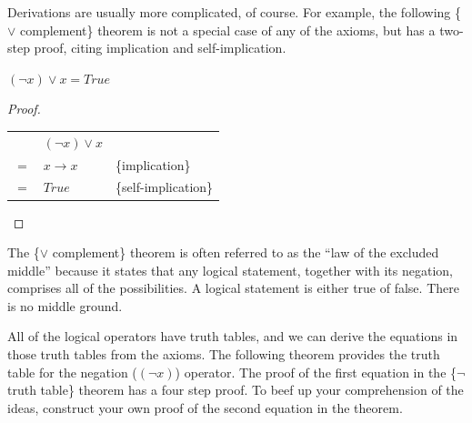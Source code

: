 Derivations are usually more complicated, of course. For example, the following
\{$\vee$ complement\} theorem is not a special case of any
of the axioms, but has a two-step proof, citing implication
and self-implication.

\begin{theorem}
$(\neg x) \vee x = True$
\end{theorem}
\begin{proof}
\mbox{}\\
\begin{tabular}{lll}
    & $(\neg x) \vee x$ & \\
$=$ & $x \rightarrow x$ & \{implication\} \\
$=$ & $True$            & \{self-implication\} \\
\end{tabular}

\end{proof}

The \{$\vee$ complement\} theorem is often referred to as the
``law of the excluded middle'' because it states that any
logical statement, together with its negation, comprises all
of the possibilities. A logical statement is either true of false.
There is no middle ground.

All of the logical operators have truth tables, and we can derive the equations in those truth tables from the axioms.
The following theorem provides the truth table for the negation ($(\neg x)$) operator.
The proof of the first equation in the \{$\neg$ truth table\} theorem has a four step proof.
To beef up your comprehension of the ideas, construct your own proof of the second equation in the theorem.

